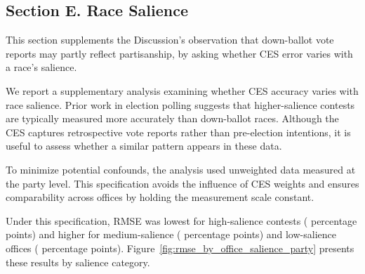 
\subsection*{Section E. Race Salience}
{}
\label{app:race_salience}

This section supplements the Discussion's observation that down-ballot vote reports may partly reflect partisanship, by asking whether CES error varies with a race's salience.

We report a supplementary analysis examining whether CES accuracy varies with race salience. Prior work in election polling suggests that higher-salience contests are typically measured more accurately than down-ballot races. Although the CES captures retrospective vote reports rather than pre-election intentions, it is useful to assess whether a similar pattern appears in these data.

To minimize potential confounds, the analysis used unweighted data measured at the party level. This specification avoids the influence of CES weights and ensures comparability across offices by holding the measurement scale constant.

Under this specification, RMSE was lowest for high-salience contests (\SalienceHigh{} percentage points) and higher for medium-salience (\SalienceMedium{} percentage points) and low-salience offices (\SalienceLow{} percentage points). Figure~\ref{fig:rmse_by_office_salience_party} presents these results by salience category.

